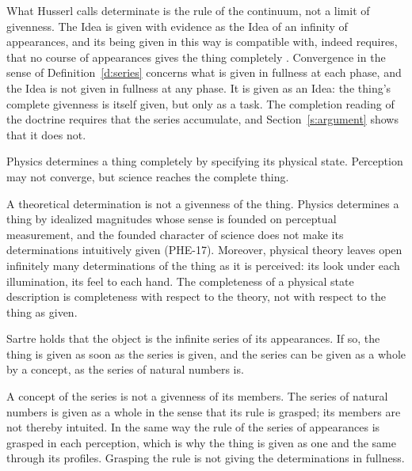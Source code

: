 \documentclass{situationist-preprint}
\begin{document}
\begin{reply}
What Husserl calls determinate is the rule of the continuum, not a limit of givenness. The Idea is given with evidence as the Idea of an infinity of appearances, and its being given in this way is compatible with, indeed requires, that no course of appearances gives the thing completely \citep[§143]{Husserl1913}. Convergence in the sense of Definition~\ref{d:series} concerns what is given in fullness at each phase, and the Idea is not given in fullness at any phase. It is given as an Idea: the thing's complete givenness is itself given, but only as a task. The completion reading of the doctrine requires that the series accumulate, and Section~\ref{s:argument} shows that it does not.
\end{reply}

\begin{objection}[Science]
Physics determines a thing completely by specifying its physical state. Perception may not converge, but science reaches the complete thing.
\end{objection}

\begin{reply}
A theoretical determination is not a givenness of the thing. Physics determines a thing by idealized magnitudes whose sense is founded on perceptual measurement, and the founded character of science does not make its determinations intuitively given (PHE-17). Moreover, physical theory leaves open infinitely many determinations of the thing as it is perceived: its look under each illumination, its feel to each hand. The completeness of a physical state description is completeness with respect to the theory, not with respect to the thing as given.
\end{reply}

\begin{objection}
Sartre holds that the object is the infinite series of its appearances. If so, the thing is given as soon as the series is given, and the series can be given as a whole by a concept, as the series of natural numbers is.
\end{objection}

\begin{reply}
A concept of the series is not a givenness of its members. The series of natural numbers is given as a whole in the sense that its rule is grasped; its members are not thereby intuited. In the same way the rule of the series of appearances is grasped in each perception, which is why the thing is given as one and the same through its profiles. Grasping the rule is not giving the determinations in fullness.
\end{reply}
\end{document}

